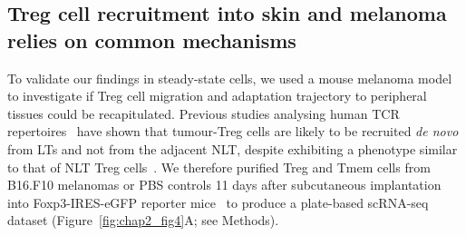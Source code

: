 \subsection{Treg cell recruitment into skin and melanoma relies on common mechanisms}
\label{section2.2.4}
To validate our findings in steady-state cells, we used a mouse melanoma model to investigate if Treg cell migration and adaptation trajectory to peripheral tissues could be recapitulated. Previous studies analysing human TCR repertoires~\citep{Sherwood2013-jf,Plitas2016-rg} have shown that tumour-Treg cells are likely to be recruited \textit{de novo} from LTs and not from the adjacent NLT, despite exhibiting a phenotype similar to that of NLT Treg cells~\citep{Plitas2016-rg,De_Simone2016-yo}. We therefore purified Treg and Tmem cells from B16.F10 melanomas or PBS controls 11 days after subcutaneous implantation into Foxp3-IRES-eGFP reporter mice~\citep{Haribhai2007-tk} to produce a plate-based scRNA-seq dataset (Figure~\ref{fig:chap2_fig4}A; see Methods).

